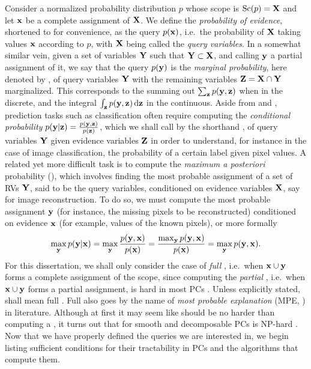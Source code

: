 Consider a normalized probability distribution $p$ whose scope is $\operatorname*{\normalfont{Sc}}(p)=\mathbf{X}$ and let
$\mathbf{x}$ be a complete assignment of $\mathbf{X}$. We define the \emph{probability of evidence},
shortened to \evi{} for convenience, as the query $p(\mathbf{x})$, i.e.\ the probability of $\mathbf{X}$
taking values $\mathbf{x}$ according to $p$, with $\mathbf{X}$ being called the \emph{query variables}.
In a somewhat similar vein, given a set of variables $\mathbf{Y}$ such that $\mathbf{Y}\subset\mathbf{X}$,
and calling $\mathbf{y}$ a partial assignment of it, we say that the query $p(\mathbf{y})$ is the
\emph{marginal probability}, here denoted by \mar{}, of query variables $\mathbf{Y}$ with the
remaining variables $\mathbf{Z}=\mathbf{X}\cap \mathbf{Y}$ marginalized. This corresponds to the summing out
$\sum_{\mathbf{z}}p(\mathbf{y}, \mathbf{z})$ when in the discrete, and the integral
$\int_{\mathbf{z}}p(\mathbf{y},\mathbf{z})\mathop{}\!\mathrm{d}\mathbf{z}$ in the continuous. Aside from \evi{} and \mar{},
prediction tasks such as classification often require computing the \emph{conditional probability}
$p(\mathbf{y}|\mathbf{z})=\frac{p(\mathbf{y},\mathbf{z})}{p(\mathbf{z})}$, which we shall call by the shorthand
\con{}, of query variables $\mathbf{Y}$ given evidence variables $\mathbf{Z}$ in order to understand, for
instance in the case of image classification, the probability of a certain label given pixel
values. A related yet more difficult task is to compute the \emph{maximum a posteriori} probability
(\map{}), which involves finding the most probable assignment of a set of RVs $\mathbf{Y}$, said to be
the query variables, conditioned on evidence variables $\mathbf{X}$, say for image reconstruction. To
do so, we must compute the most probable assignment $\mathbf{y}$ (for instance, the missing pixels to
be reconstructed) conditioned on evidence $\mathbf{x}$ (for example, values of the known pixels), or
more formally
\begin{equation}
  \max_{\mathbf{y}}p(\mathbf{y}|\mathbf{x})=\max_{\mathbf{y}}\frac{p(\mathbf{y},\mathbf{x})}{p(\mathbf{x})}=
  \frac{\max_{\mathbf{y}}p(\mathbf{y},\mathbf{x})}{p(\mathbf{x})}=\max_{\mathbf{y}}p(\mathbf{y},\mathbf{x}).
  \label{eq:map}
\end{equation}
For this dissertation, we shall only consider the case of \emph{full} \map{}, i.e.\ when
$\mathbf{x}\cup\mathbf{y}$ forms a complete assignment of the scope, since computing the \emph{partial}
\map{}, i.e.\ when $\mathbf{x}\cup\mathbf{y}$ forms a partial assignment, is hard in most PCs
\citep{peharz16,decampos11}. Unless explicitly stated, \map{} shall mean full \map{}. Full \map{}
also goes by the name of \emph{most probable explanation} (MPE, \cite{darwiche09}) in literature.
Although at first it may seem like \map{} should be no harder than computing a \con{}, it turns out
that for smooth and decomposable PCs \map{} is NP-hard \citep{conaty17,mei18}. Now that we have
properly defined the queries we are interested in, we begin listing sufficient conditions for their
tractability in PCs and the algorithms that compute them.


